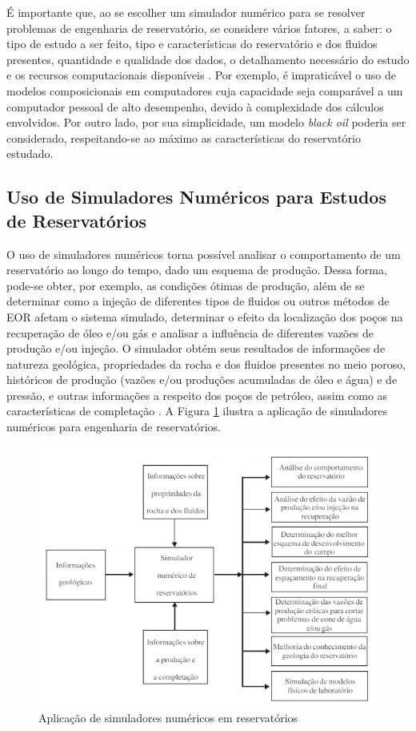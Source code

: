 
É importante que, ao se escolher um simulador numérico para se resolver problemas de engenharia de reservatório, se considere vários fatores, a saber: o tipo de estudo a ser feito, tipo e características do reservatório e dos fluidos presentes, quantidade e qualidade dos dados, o detalhamento necessário do estudo e os recursos computacionais disponíveis \cite[p. 519]{engres}. Por exemplo, é impraticável o uso de modelos composicionais em computadores cuja capacidade seja comparável a um computador pessoal de alto desempenho, devido à complexidade dos cálculos envolvidos. Por outro lado, por sua simplicidade, um modelo \textit{black oil} poderia ser considerado, respeitando-se ao máximo as características do reservatório estudado.

\subsection{Uso de Simuladores Numéricos para Estudos de Reservatórios}

O uso de simuladores numéricos torna possível analisar o comportamento de um reservatório ao longo do tempo, dado um esquema de produção. Dessa forma, pode-se obter, por exemplo, as condições ótimas de produção, além de se determinar como a injeção de diferentes tipos de fluidos ou outros métodos de EOR afetam o sistema simulado, determinar o efeito da localização dos poços na recuperação de óleo e/ou gás e analisar a influência de diferentes vazões de produção e/ou injeção. O simulador obtém seus resultados de informações de natureza geológica, propriedades da rocha e dos fluidos presentes no meio poroso, históricos de produção (vazões e/ou produções acumuladas de óleo e água) e de pressão, e outras informações a respeito dos poços de petróleo, assim como as características de completação \cite[pp. 522--523]{engres}. A Figura \ref{fig:revisao_simsec1} ilustra a aplicação de simuladores numéricos para engenharia de reservatórios.

\begin{figure}[!ht]
	\centering
	\includegraphics[width=.6\textwidth]{figs/revisao/revisao_simsec1}
	\caption{Aplicação de simuladores numéricos em reservatórios \cite[p. 522]{engres}}
	\label{fig:revisao_simsec1}
\end{figure}  

